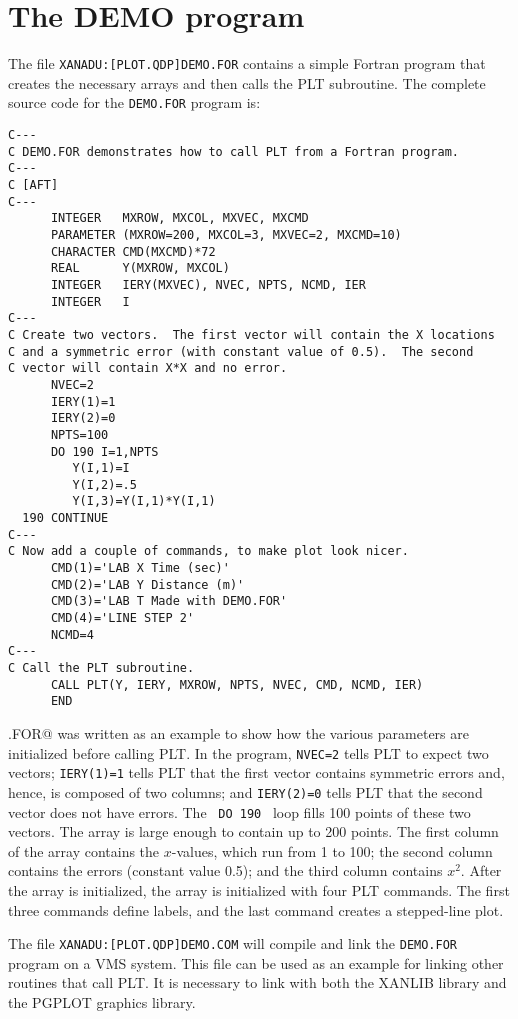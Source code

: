 \pagebreak
\section{The DEMO program}
The file {\tt XANADU:[PLOT.QDP]DEMO.FOR} contains a simple Fortran
program that creates the necessary arrays and then calls the PLT
subroutine.
The complete source code for the {\tt DEMO.FOR} program is:
\medskip
\begin{verbatim}
C---
C DEMO.FOR demonstrates how to call PLT from a Fortran program.
C---
C [AFT]
C---
      INTEGER   MXROW, MXCOL, MXVEC, MXCMD
      PARAMETER (MXROW=200, MXCOL=3, MXVEC=2, MXCMD=10)
      CHARACTER CMD(MXCMD)*72
      REAL      Y(MXROW, MXCOL)
      INTEGER   IERY(MXVEC), NVEC, NPTS, NCMD, IER
      INTEGER   I
C---
C Create two vectors.  The first vector will contain the X locations
C and a symmetric error (with constant value of 0.5).  The second
C vector will contain X*X and no error.
      NVEC=2
      IERY(1)=1
      IERY(2)=0
      NPTS=100
      DO 190 I=1,NPTS
         Y(I,1)=I
         Y(I,2)=.5
         Y(I,3)=Y(I,1)*Y(I,1)
  190 CONTINUE
C---
C Now add a couple of commands, to make plot look nicer.
      CMD(1)='LAB X Time (sec)'
      CMD(2)='LAB Y Distance (m)'
      CMD(3)='LAB T Made with DEMO.FOR'
      CMD(4)='LINE STEP 2'
      NCMD=4
C---
C Call the PLT subroutine.
      CALL PLT(Y, IERY, MXROW, NPTS, NVEC, CMD, NCMD, IER)
      END
\end{verbatim}
\medskip

\verb@DEMO.FOR@ was written as an example to show how the various
parameters are initialized before calling PLT.
In the program, {\tt NVEC=2} tells PLT to expect two vectors;
{\tt IERY(1)=1} tells PLT that the first vector contains symmetric errors
and, hence, is composed of two columns;
and {\tt IERY(2)=0} tells PLT
that the second vector does not have errors.
The \, {\tt DO~190} \, loop fills 100 points of these two vectors.
The \verb@Y@ array is large enough to contain up to 200 points.
The first column of the \verb@Y@ array contains the $x$-values, which
run from 1 to 100; the second column contains the errors
(constant value 0.5); and
the third column contains $x^2$.
After the \verb@Y@ array is initialized, the \verb@CMD@ array is
initialized with four PLT commands.
The first three commands define labels, and the last command creates
a stepped-line plot.

The file {\tt XANADU:[PLOT.QDP]DEMO.COM}
will compile and link the {\tt DEMO.FOR} program on a VMS system.
This file can be used as an example
for linking other routines that call PLT.
It is necessary to link with both the XANLIB library
and the PGPLOT graphics library.

